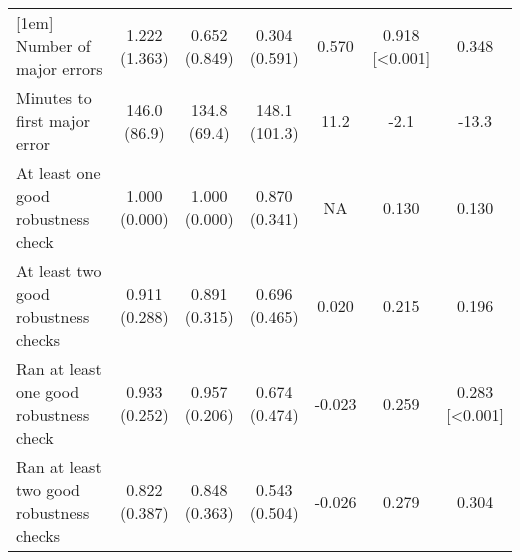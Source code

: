 \begin{table}[ht]
{\begin{tabular}{lcccccc}
[1em]
Number of major errors & \shortstack{1.222\\(1.363)} & \shortstack{0.652\\(0.849)} & \shortstack{0.304\\(0.591)} & \shortstack{0.570\\[0.018]} & \shortstack{0.918\\[\textless0.001]} & \shortstack{0.348\\[0.025]}\\
[1em]
Minutes to first major error & \shortstack{146.0\\(86.9)} & \shortstack{134.8\\(69.4)} & \shortstack{148.1\\(101.3)} & \shortstack{11.2\\[0.626]} & \shortstack{-2.1\\[0.950]} & \shortstack{-13.3\\[0.661]}\\
[1em]
At least one good robustness check & \shortstack{1.000\\(0.000)} & \shortstack{1.000\\(0.000)} & \shortstack{0.870\\(0.341)} & \shortstack{NA\\[NA]} & \shortstack{0.130\\[0.012]} & \shortstack{0.130\\[0.011]}\\
[1em]
At least two good robustness checks & \shortstack{0.911\\(0.288)} & \shortstack{0.891\\(0.315)} & \shortstack{0.696\\(0.465)} & \shortstack{0.020\\[0.755]} & \shortstack{0.215\\[0.010]} & \shortstack{0.196\\[0.020]}\\
[1em]
Ran at least one good robustness check & \shortstack{0.933\\(0.252)} & \shortstack{0.957\\(0.206)} & \shortstack{0.674\\(0.474)} & \shortstack{-0.023\\[0.632]} & \shortstack{0.259\\[0.002]} & \shortstack{0.283\\[\textless0.001]}\\
[1em]
Ran at least two good robustness checks & \shortstack{0.822\\(0.387)} & \shortstack{0.848\\(0.363)} & \shortstack{0.543\\(0.504)} & \shortstack{-0.026\\[0.745]} & \shortstack{0.279\\[0.004]} & \shortstack{0.304\\[0.001]}\\

\end{tabular}}
\end{table}
